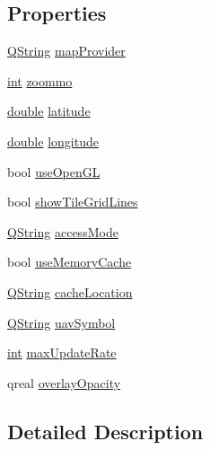 \subsection*{Properties}
\begin{DoxyCompactItemize}
\item 
\hyperlink{group___u_a_v_objects_plugin_gab9d252f49c333c94a72f97ce3105a32d}{Q\-String} \hyperlink{group___o_p_map_plugin_ga6796d346f4d9edbe710a92a987f88659}{map\-Provider}
\item 
\hyperlink{ioapi_8h_a787fa3cf048117ba7123753c1e74fcd6}{int} \hyperlink{group___o_p_map_plugin_gac07e4414a740f31223ffb1ce430ca3e8}{zoommo}
\item 
\hyperlink{_super_l_u_support_8h_a8956b2b9f49bf918deed98379d159ca7}{double} \hyperlink{group___o_p_map_plugin_gaadef11a946190d55fa1bc45821414b77}{latitude}
\item 
\hyperlink{_super_l_u_support_8h_a8956b2b9f49bf918deed98379d159ca7}{double} \hyperlink{group___o_p_map_plugin_ga7832a8e775f6e51898ad0075b150ccd5}{longitude}
\item 
bool \hyperlink{group___o_p_map_plugin_gae922073575fb74cc0fa15b73223982ac}{use\-Open\-G\-L}
\item 
bool \hyperlink{group___o_p_map_plugin_gaa46dc27228fb9c47c0c10f520d6099ab}{show\-Tile\-Grid\-Lines}
\item 
\hyperlink{group___u_a_v_objects_plugin_gab9d252f49c333c94a72f97ce3105a32d}{Q\-String} \hyperlink{group___o_p_map_plugin_ga1b705326683a741d51646ad6c16a0687}{access\-Mode}
\item 
bool \hyperlink{group___o_p_map_plugin_gae936e72883265ab40e9b30a0baaed122}{use\-Memory\-Cache}
\item 
\hyperlink{group___u_a_v_objects_plugin_gab9d252f49c333c94a72f97ce3105a32d}{Q\-String} \hyperlink{group___o_p_map_plugin_ga182bffa488612f55a34e696590887dbf}{cache\-Location}
\item 
\hyperlink{group___u_a_v_objects_plugin_gab9d252f49c333c94a72f97ce3105a32d}{Q\-String} \hyperlink{group___o_p_map_plugin_ga34e796aad89f226209a7325c28af859a}{uav\-Symbol}
\item 
\hyperlink{ioapi_8h_a787fa3cf048117ba7123753c1e74fcd6}{int} \hyperlink{group___o_p_map_plugin_ga3ab3b510f0eb2b7cd3b183275eba0be1}{max\-Update\-Rate}
\item 
qreal \hyperlink{group___o_p_map_plugin_gaf1bf43458d17cdb95a80a889c5508945}{overlay\-Opacity}
\end{DoxyCompactItemize}


\subsection{Detailed Description}


